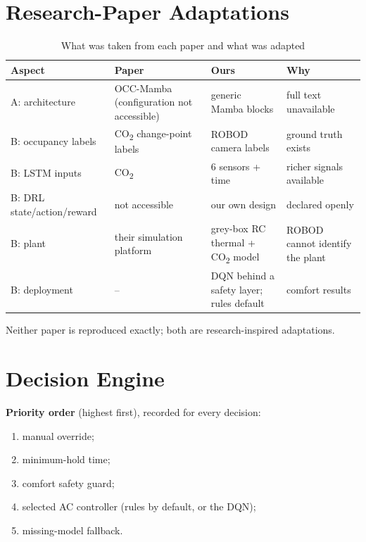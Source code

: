 \documentclass[12pt,a4paper,oneside]{report}
\newcommand{\COtwo}{CO\textsubscript{2}}
\begin{document}
\section{Research-Paper Adaptations}
\begin{table}[H]
\centering
\caption{What was taken from each paper and what was adapted}
\label{tab:adapt}
\small
\begin{tabularx}{\textwidth}{@{}L{3.0cm}L{3.4cm}L{3.6cm}Y@{}}
\toprule
\textbf{Aspect} & \textbf{Paper} & \textbf{Ours} & \textbf{Why}\\
\midrule
A: architecture & OCC-Mamba (configuration not accessible) & generic Mamba blocks & full text unavailable\\
B: occupancy labels & \COtwo{} change-point labels & ROBOD camera labels & ground truth exists\\
B: LSTM inputs & \COtwo{} & 6 sensors + time & richer signals available\\
B: DRL state/action/reward & not accessible & our own design & declared openly\\
B: plant & their simulation platform & grey-box RC thermal + \COtwo{} model & ROBOD cannot identify the plant\\
B: deployment & -- & DQN behind a safety layer; rules default & comfort results\\
\bottomrule
\end{tabularx}
\end{table}

Neither paper is reproduced exactly; both are research-inspired adaptations.

\section{Decision Engine}
\textbf{Priority order} (highest first), recorded for every decision:
\begin{enumerate}
\item manual override;
\item minimum-hold time;
\item comfort safety guard;
\item selected AC controller (rules by default, or the DQN);
\item missing-model fallback.
\end{enumerate}
\end{document}
